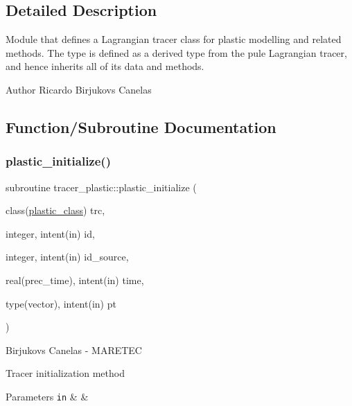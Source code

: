 \subsection{Detailed Description}
Module that defines a Lagrangian tracer class for plastic modelling and related methods. The type is defined as a derived type from the pule Lagrangian tracer, and hence inherits all of it\textquotesingle{}s data and methods. 

\begin{DoxyAuthor}{Author}
Ricardo Birjukovs Canelas 
\end{DoxyAuthor}


\subsection{Function/\+Subroutine Documentation}
\mbox{\label{namespacetracer__plastic_a9a4e16b71bcd88b95c80ddb9c3ddb7d1}} 
\subsubsection{\texorpdfstring{plastic\+\_\+initialize()}{plastic\_initialize()}}
{\footnotesize\ttfamily subroutine tracer\+\_\+plastic\+::plastic\+\_\+initialize (\begin{DoxyParamCaption}\item[{class(\mbox{\hyperlink{structtracer__plastic_1_1plastic__class}{plastic\+\_\+class}})}]{trc,  }\item[{integer, intent(in)}]{id,  }\item[{integer, intent(in)}]{id\+\_\+source,  }\item[{real(prec\+\_\+time), intent(in)}]{time,  }\item[{type(vector), intent(in)}]{pt }\end{DoxyParamCaption})\hspace{0.3cm}{\ttfamily [private]}}



Birjukovs Canelas -\/ M\+A\+R\+E\+T\+EC 

Tracer initialization method 
\begin{DoxyParams}[1]{Parameters}
\mbox{\tt in}  & {\em } & \\
\hline
\end{DoxyParams}
